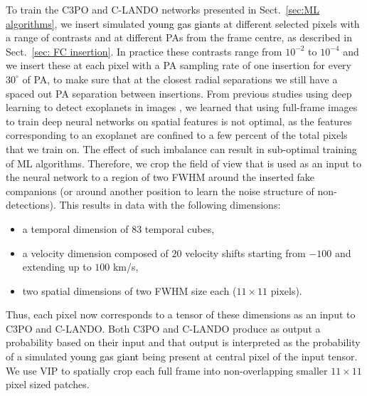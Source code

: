 \documentclass{aa}
\newcommand{\newchange}[1]{\textcolor{black}{#1}}
\begin{document}
To train the C3PO and C-LANDO networks presented in Sect.~\ref{sec:ML algorithms}, we insert simulated \newchange{young gas giant}s at different selected pixels with a range of contrasts and at different PAs from the frame centre, as described in Sect.~\ref{sec: FC insertion}.
In practice these contrasts range from $10^{-2}$ to $10^{-4}$ and we insert these at each pixel with a PA sampling rate of one insertion for every $30^{\circ}$ of PA, to make sure that at the closest radial separations we still have a spaced out PA separation between insertions. 
From previous studies using deep learning to detect exoplanets in images \citep[e.g.][]{2018Gomez,2023Carlito}, we learned that using full-frame images to train deep neural networks on spatial features is not optimal, as the features corresponding to an exoplanet are confined to a few percent of the total pixels that we train on. 
The effect of such imbalance can result in sub-optimal training of ML algorithms.
Therefore, we crop the field of view that is used as an input to the neural network to a region of two FWHM around the inserted fake companions (or around another position to learn the noise structure of non-detections).
This results in data with the following dimensions:
\begin{itemize}
    \item a temporal dimension of $83$ temporal cubes, 
    \item a velocity dimension composed of $20$ velocity shifts starting from $-100$ and extending up to $100$ km/s, 
    \item two spatial dimensions of two FWHM size each ($11\times 11$ pixels).
\end{itemize}
Thus, each pixel now corresponds to a tensor of these dimensions as an input to C3PO and C-LANDO.
Both C3PO and C-LANDO produce as output a probability based on their input and that output is interpreted as the probability of a simulated \newchange{young gas giant} being present at central pixel of the input tensor.
We use VIP to spatially crop each full frame into non-overlapping smaller $11\times11$ pixel sized patches.
\end{document}
